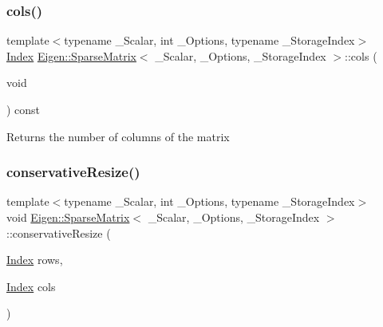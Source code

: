 \subsubsection{\texorpdfstring{cols()}{cols()}}
{\footnotesize\ttfamily template$<$typename \+\_\+\+Scalar, int \+\_\+\+Options, typename \+\_\+\+Storage\+Index$>$ \\
\mbox{\hyperlink{struct_eigen_1_1_eigen_base_a554f30542cc2316add4b1ea0a492ff02}{Index}} \mbox{\hyperlink{class_eigen_1_1_sparse_matrix}{Eigen\+::\+Sparse\+Matrix}}$<$ \+\_\+\+Scalar, \+\_\+\+Options, \+\_\+\+Storage\+Index $>$\+::cols (\begin{DoxyParamCaption}\item[{void}]{ }\end{DoxyParamCaption}) const\hspace{0.3cm}{\ttfamily [inline]}}

\begin{DoxyReturn}{Returns}
the number of columns of the matrix 
\end{DoxyReturn}
\mbox{\label{class_eigen_1_1_sparse_matrix_a9dc538b2c1fe9027ba58f31ee83b2ff1}} 
\subsubsection{\texorpdfstring{conservativeResize()}{conservativeResize()}}
{\footnotesize\ttfamily template$<$typename \+\_\+\+Scalar, int \+\_\+\+Options, typename \+\_\+\+Storage\+Index$>$ \\
void \mbox{\hyperlink{class_eigen_1_1_sparse_matrix}{Eigen\+::\+Sparse\+Matrix}}$<$ \+\_\+\+Scalar, \+\_\+\+Options, \+\_\+\+Storage\+Index $>$\+::conservative\+Resize (\begin{DoxyParamCaption}\item[{\mbox{\hyperlink{struct_eigen_1_1_eigen_base_a554f30542cc2316add4b1ea0a492ff02}{Index}}}]{rows,  }\item[{\mbox{\hyperlink{struct_eigen_1_1_eigen_base_a554f30542cc2316add4b1ea0a492ff02}{Index}}}]{cols }\end{DoxyParamCaption})\hspace{0.3cm}{\ttfamily [inline]}}

